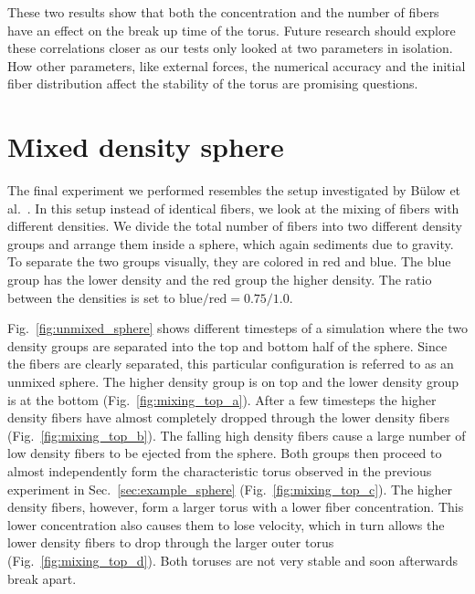 These two results show that both the concentration and the number of fibers have an effect on the break up time of the torus. Future research should explore these correlations closer as our tests only looked at two parameters in isolation. How other parameters, like external forces, the numerical accuracy and the initial fiber distribution affect the stability of the torus are promising questions.

\section{Mixed density sphere}
\label{sec:mixed_density_sphere}

The final experiment we performed resembles the setup investigated by Bülow et al.~\cite{Bulow2015}. In this setup instead of identical fibers, we look at the mixing of fibers with different densities. We divide the total number of fibers into two different density groups and arrange them inside a sphere, which again sediments due to gravity. To separate the two groups visually, they are colored in red and blue. The blue group has the lower density and the red group the higher density. The ratio between the densities is set to $\text{blue} / \text{red}= 0.75 / 1.0$.

Fig.~\ref{fig:unmixed_sphere} shows different timesteps of a simulation where the two density groups are separated into the top and bottom half of the sphere. Since the fibers are clearly separated, this particular configuration is referred to as an unmixed sphere. The higher density group is on top and the lower density group is at the bottom (Fig.~\ref{fig:mixing_top_a}). After a few timesteps the higher density fibers have almost completely dropped through the lower density fibers (Fig.~\ref{fig:mixing_top_b}). The falling high density fibers cause a large number of low density fibers to be ejected from the sphere. Both groups then proceed to almost independently form the characteristic torus observed in the previous experiment in Sec.~\ref{sec:example_sphere} (Fig.~\ref{fig:mixing_top_c}). The higher density fibers, however, form a larger torus with a lower fiber concentration. This lower concentration also causes them to lose velocity, which in turn allows the lower density fibers to drop through the larger outer torus (Fig.~\ref{fig:mixing_top_d}). Both toruses are not very stable and soon afterwards break apart.

